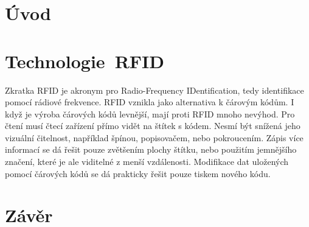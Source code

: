 
\chapter{Úvod}
\label{uvod}

\chapter{Technologie\ RFID}
\label{technologie_rfid}
Zkratka RFID je akronym pro {Radio-Frequency IDentification}, tedy identifikace pomocí rádiové frekvence. RFID vznikla jako alternativa k čárovým kódům. I když je výroba čárových kódů levnější, mají proti RFID mnoho nevýhod. Pro čtení musí čtecí zařízení přímo vidět na štítek s kódem. Nesmí být snížená jeho vizuální čitelnost, například špínou, popisovačem, nebo pokroucením. Zápis více informací se dá řešit pouze zvětšením plochy štítku, nebo použitím jemnějšího značení, které je ale viditelné z menší vzdálenosti. Modifikace dat uložených pomocí čárových kódů se dá prakticky řešit pouze tiskem nového kódu.\cite{The_RF_in_RFID}























\chapter{Závěr}
\label{zaver}



